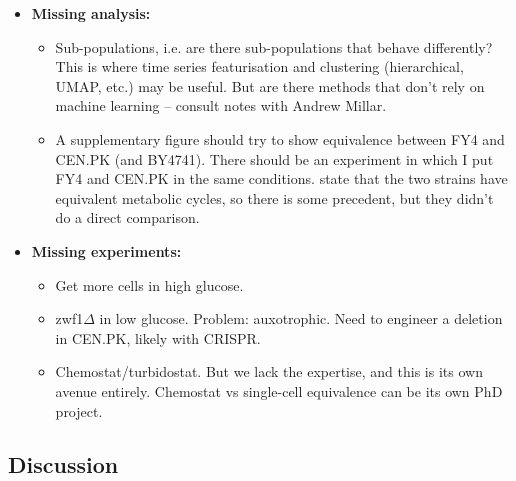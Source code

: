 \begin{itemize}
\item \textbf{Missing analysis:}
\begin{itemize}
\item Sub-populations, i.e. are there sub-populations that behave differently?  This is where time series featurisation and clustering (hierarchical, UMAP, etc.) may be useful.  But are there methods that don't rely on machine learning -- consult notes with Andrew Millar.
\item A supplementary figure should try to show equivalence between FY4 and CEN.PK (and BY4741).  There should be an experiment in which I put FY4 and CEN.PK in the same conditions. \cite{baumgartnerFlavinbasedMetabolicCycles2018} state that the two strains have equivalent metabolic cycles, so there is some precedent, but they didn't do a direct comparison.
\end{itemize}
\item \textbf{Missing experiments:}
\begin{itemize}
\item Get more cells in high glucose.
\item zwf1\(\Delta\) in low glucose.  Problem: auxotrophic.  Need to engineer a deletion in CEN.PK, likely with CRISPR.
\item Chemostat/turbidostat.  But we lack the expertise, and this is its own avenue entirely.  Chemostat vs single-cell equivalence can be its own PhD project.
\end{itemize}
\end{itemize}

\subsection{Discussion}
\label{sec:org2f5c96b}

